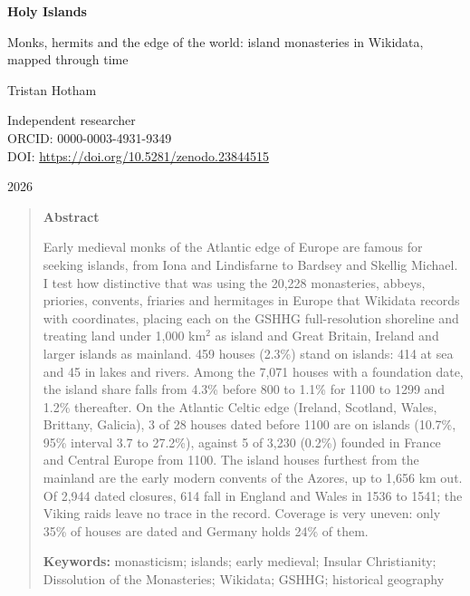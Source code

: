 \documentclass[11pt,a4paper]{article}
\begin{document}
\begin{center}
{\Large\bfseries Holy Islands\par}
\vspace{0.4em}
{\large Monks, hermits and the edge of the world: island monasteries in Wikidata, mapped through time\par}
\vspace{1.2em}
{\large Tristan Hotham\par}
\vspace{0.3em}
{\small Independent researcher\\
ORCID: 0000-0003-4931-9349\\
DOI: \href{https://doi.org/10.5281/zenodo.23844515}{https://doi.org/10.5281/zenodo.23844515}\par}
\vspace{0.8em}
2026
\end{center}

\begin{quote}
\small
\begin{center}\textbf{Abstract}\end{center}
Early medieval monks of the Atlantic edge of Europe are famous for seeking islands, from Iona and Lindisfarne to Bardsey and Skellig Michael. I test how distinctive that was using the 20,228 monasteries, abbeys, priories, convents, friaries and hermitages in Europe that Wikidata records with coordinates, placing each on the GSHHG full-resolution shoreline and treating land under 1,000 km$^2$ as island and Great Britain, Ireland and larger islands as mainland. 459 houses (2.3\%) stand on islands: 414 at sea and 45 in lakes and rivers. Among the 7,071 houses with a foundation date, the island share falls from 4.3\% before 800 to 1.1\% for 1100 to 1299 and 1.2\% thereafter. On the Atlantic Celtic edge (Ireland, Scotland, Wales, Brittany, Galicia), 3 of 28 houses dated before 1100 are on islands (10.7\%, 95\% interval 3.7 to 27.2\%), against 5 of 3,230 (0.2\%) founded in France and Central Europe from 1100. The island houses furthest from the mainland are the early modern convents of the Azores, up to 1,656 km out. Of 2,944 dated closures, 614 fall in England and Wales in 1536 to 1541; the Viking raids leave no trace in the record. Coverage is very uneven: only 35\% of houses are dated and Germany holds 24\% of them.

\textbf{Keywords:} monasticism; islands; early medieval; Insular Christianity; Dissolution of the Monasteries; Wikidata; GSHHG; historical geography
\end{quote}
\end{document}
